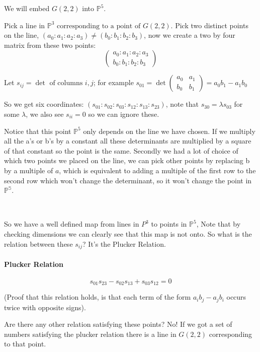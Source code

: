 We will embed $G(2,2)$ into $\mathbb{P}^5$.

Pick a line in $\mathbb{P}^3 \text{ corresponding to a point of }G(2,2)$. Pick two distinct  points on the line, $(a_0\colon a_1\colon a_2\colon a_3)\neq(b_0\colon b_1\colon b_2\colon b_3)$, now we create a two by four matrix from these two points:\[\begin{pmatrix}
    a_0\colon a_1\colon a_2\colon a_3\\
    b_0\colon b_1\colon b_2\colon b_3
\end{pmatrix}\]

Let $s_{ij} = \det \text{ of columns }i,j$; for example $s_{01} = \det\begin{pmatrix}
    a_0& a_1\\
    b_0& b_1
\end{pmatrix} = a_0b_1-a_1b_0$

So we get six coordinates: $(s_{01}\colon s_{02}\colon s_{03}\colon s_{12}\colon s_{13}\colon s_{23})$, note that $s_{30} = \lambda s_{03}$ for some $\lambda$, we also see $s_{ii} = 0$ so we can ignore these.


Notice that this point $\mathbb{P}^5$ only depends on the line we have chosen. If we multiply all the a's or b's by a constant all these determinants are multiplied by a square of that constant so the point is the same. Secondly we had a lot of choice of which two points we placed on the line, we can pick other points by replacing b by a multiple of $a$, which is equivalent to adding a multiple of the first row to the second row which 
won't change the determinant, so it won't change the point in $\mathbb{P^5}$.

\

So we have a well defined map from lines in $P^3$ to points in $\mathbb{P}^5$, Note that by checking dimensions we can clearly see that this map is not onto.  So what is the relation between these $s_{ij}$? It's the Plucker Relation.

\paragraph*{Plucker Relation}
\[s_{01}s_{23} - s_{02}s_{13}+s_{03}s_{12} = 0\]

(Proof that this relation holds, is that each term of the form ${a_i}{b_j} - {a_j}{b_i}$ occurs twice with opposite signs).


Are there any other relation satisfying these points? No! If we got a set of numbers satisfying the plucker relation there is a line in $G(2,2)$ corresponding to that point.

